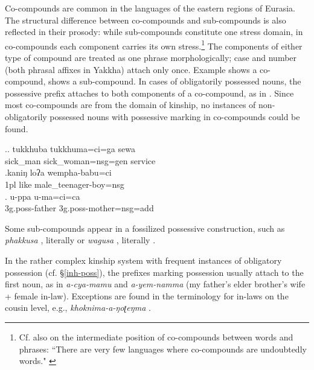 Co-compounds are common in the languages of the eastern regions of Eurasia. The structural difference between co-compounds and sub-compounds is also reflected in their prosody: while sub-compounds constitute one stress domain, in co-compounds each component carries its own stress.\footnote{Cf. also \citet{Waelchli2005_Co-compounds} on the intermediate position of co-compounds between words and phrases: “There are very few languages where co-compounds are undoubtedly words." \cite[3]{Waelchli2005_Co-compounds}} The components of either type of compound are treated as one phrase morphologically; case and number (both phrasal affixes in Yakkha) attach only once. Example \Next[a] shows a co-compound, \Next[b] shows a sub-compound.  In cases of obligatorily possessed nouns, the possessive prefix attaches to both components of a co-compound, as in \Next[c]. Since most co-compounds are from the domain of kinship, no instances of non-obligatorily possessed nouns with possessive marking in co-compounds  could be found. 


 \ex.\ag. tukkhuba tukkhuma=ci=ga   sewa\\ 
sick\_man sick\_woman{\sc =nsg=gen} service\\
 \bg.kaniŋ loʔa wempha-babu=ci\\
 {\sc 1pl} like male\_teenager-boy{\sc =nsg}\\
  
\bg.  u-ppa u-ma=ci=ca\\
{\sc 3g.poss-}father {\sc 3g.poss-}mother{\sc =nsg=add}\\
 

Some sub-compounds appear in a fossilized possessive construction, such as \emph{phak\-kusa} , literally  or \emph{wagusa} , literally .

 In the rather complex kinship system with frequent instances of obligatory possession (cf. §\ref{inh-poss}), the prefixes marking possession usually attach to the first noun, as in  \emph{a-cya-mamu}  and  \emph{a-yem-namma}  (my father's elder brother's wife + female in-law). Exceptions are found in the terminology for in-laws on the cousin level, e.g., \emph{khoknima-a-ŋoʈeŋma} .
 
